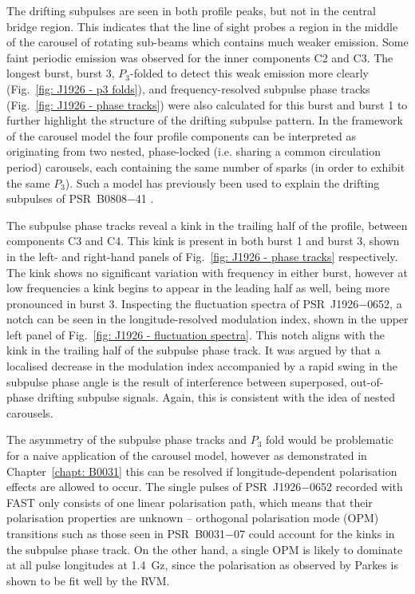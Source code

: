 The drifting subpulses are seen in both profile peaks, but not in the central bridge region. This indicates that the line of sight probes a region in the middle of the carousel of rotating sub-beams which contains much weaker emission. Some faint periodic emission was observed for the inner components C2 and C3. The longest burst, burst 3, $P_3$-folded to detect this weak emission more clearly (Fig.~\ref{fig: J1926 - p3 folds}), and frequency-resolved subpulse phase tracks (Fig.~\ref{fig: J1926 - phase tracks}) were also calculated for this burst and burst 1 to further highlight the structure of the drifting subpulse pattern. In the framework of the carousel model the four profile components can be interpreted as originating from two nested, phase-locked (i.e. sharing a common circulation period) carousels, each containing the same number of sparks (in order to exhibit the same $P_3$). Such a model has previously been used to explain the drifting subpulses of PSR~B0808$-$41 \citep{BBGx2009}.  

The subpulse phase tracks reveal a kink in the trailing half of the profile, between components C3 and C4. This kink is present in both burst 1 and burst 3, shown in the left- and right-hand panels of Fig.~\ref{fig: J1926 - phase tracks} respectively. The kink shows no significant variation with frequency in either burst, however at low frequencies a kink begins to appear in the leading half as well, being more pronounced in burst 3. Inspecting the fluctuation spectra of PSR~J1926$-$0652, a notch can be seen in the longitude-resolved modulation index, shown in the upper left panel of Fig.~\ref{fig: J1926 - fluctuation spectra}. This notch aligns with the kink in the trailing half of the subpulse phase track. It was argued by \citet{ESLx2003} that a localised decrease in the modulation index accompanied by a rapid swing in the subpulse phase angle is the result of interference between superposed, out-of-phase drifting subpulse signals. Again, this is consistent with the idea of nested carousels.  

The asymmetry of the subpulse phase tracks and $P_3$ fold would be problematic for a naive application of the carousel model, however as demonstrated in Chapter~\ref{chapt: B0031} this can be resolved if longitude-dependent polarisation effects are allowed to occur. The single pulses of PSR~J1926$-$0652 recorded with FAST only consists of one linear polarisation path, which means that their polarisation properties are unknown -- orthogonal polarisation mode (OPM) transitions such as those seen in PSR~B0031$-$07 could account for the kinks in the subpulse phase track. On the other hand, a single OPM is likely to dominate at all pulse longitudes at 1.4~Gz, since the polarisation as observed by Parkes is shown to be fit well by the RVM.

